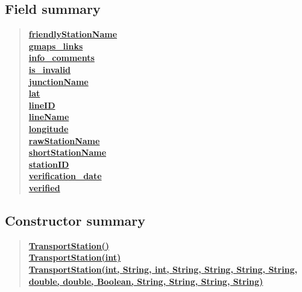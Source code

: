 \documentclass[11pt,a4paper]{report}
\begin{document}
{{{{{{{{{{{{{{{{{{\subsection{Field summary}{
\begin{verse}
\hyperlink{Models.TransportStation.friendlyStationName}{{\bf friendlyStationName}} \\
\hyperlink{Models.TransportStation.gmaps_links}{{\bf gmaps\_links}} \\
\hyperlink{Models.TransportStation.info_comments}{{\bf info\_comments}} \\
\hyperlink{Models.TransportStation.is_invalid}{{\bf is\_invalid}} \\
\hyperlink{Models.TransportStation.junctionName}{{\bf junctionName}} \\
\hyperlink{Models.TransportStation.lat}{{\bf lat}} \\
\hyperlink{Models.TransportStation.lineID}{{\bf lineID}} \\
\hyperlink{Models.TransportStation.lineName}{{\bf lineName}} \\
\hyperlink{Models.TransportStation.longitude}{{\bf longitude}} \\
\hyperlink{Models.TransportStation.rawStationName}{{\bf rawStationName}} \\
\hyperlink{Models.TransportStation.shortStationName}{{\bf shortStationName}} \\
\hyperlink{Models.TransportStation.stationID}{{\bf stationID}} \\
\hyperlink{Models.TransportStation.verification_date}{{\bf verification\_date}} \\
\hyperlink{Models.TransportStation.verified}{{\bf verified}} \\
\end{verse}
}
\subsection{Constructor summary}{
\begin{verse}
\hyperlink{Models.TransportStation()}{{\bf TransportStation()}} \\
\hyperlink{Models.TransportStation(int)}{{\bf TransportStation(int)}} \\
\hyperlink{Models.TransportStation(int, java.lang.String, int, java.lang.String, java.lang.String, java.lang.String, java.lang.String, double, double, java.lang.Boolean, java.lang.String, java.lang.String, java.lang.String, java.lang.String)}{{\bf TransportStation(int, String, int, String, String, String, String, double, double, Boolean, String, String, String, String)}} \\
\end{verse}
}
}}}}}}}}}}}}}}}}}}
\end{document}
